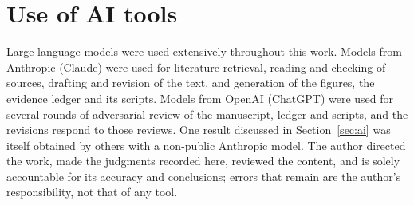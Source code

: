\section*{Use of AI tools}
Large language models were used extensively throughout this work. Models from Anthropic (Claude) were used for literature retrieval, reading and checking of sources, drafting and revision of the text, and generation of the figures, the evidence ledger and its scripts. Models from OpenAI (ChatGPT) were used for several rounds of adversarial review of the manuscript, ledger and scripts, and the revisions respond to those reviews. One result discussed in Section~\ref{sec:ai} was itself obtained by others with a non-public Anthropic model. The author directed the work, made the judgments recorded here, reviewed the content, and is solely accountable for its accuracy and conclusions; errors that remain are the author's responsibility, not that of any tool.
